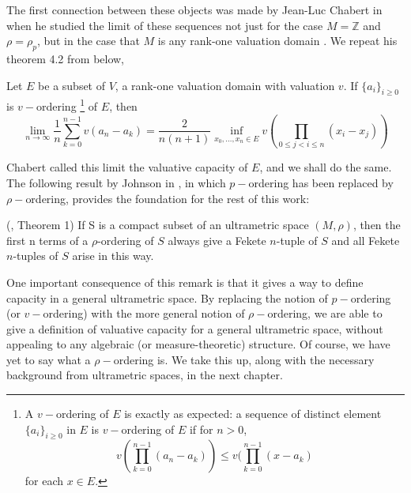 The first connection between these objects was made by Jean-Luc Chabert in \cite{jlc} when he studied the limit of these sequences not just for the case $M=\mathbb{Z}$ and $\rho=\rho_p$, but in the case that $M$ is any rank-one valuation domain \cite{jlc}. We repeat his theorem 4.2 from \cite{jlc} below,

\begin{proposition}
Let $E$ be a subset of $V$, a rank-one valuation domain with valuation $v$. If $\{a_i\}_{i \geq 0}$ is $v-$ordering \footnote{A $v-$ordering of $E$ is exactly as expected: a sequence of distinct element $\{a_i\}_{i \geq 0}$ in $E$ is $v-$ordering of $E$ if for $n >0$,
\[ v(\prod_{k=0}^{n-1} (a_n-a_k) ) \leq v(\prod_{k=0}^{n-1} (x-a_k)  \] for each $x \in E$.} of $E$, then
\[\lim_{n\to\infty} \frac{1}{n} \sum_{k=0}^{n-1} v(a_n-a_k) =\frac{2}{n(n+1)} \inf_{x_0, \ldots, x_n \in E} v (\prod_{0\leq j < i \leq n} (x_i-x_j))\]
\end{proposition}

Chabert called this limit the valuative capacity of $E$, and we shall do the same. The following result by Johnson in \cite{kj}, in which $p-$ordering has been replaced by $\rho-$ordering, provides the foundation for the rest of this work:

\begin{proposition*} (\cite{kj}, Theorem 1)
If S is a compact subset of an ultrametric space $(M, \rho)$, then the first n terms of a $\rho$-ordering of $S$ always give a Fekete $n$-tuple of $S$ and all Fekete $n$-tuples of $S$ arise in this way.
\end{proposition*}

One important consequence of this remark is that it gives a way to define capacity in a general ultrametric space. By replacing the notion of $p-$ordering (or $v-$ordering) with the more general notion of $\rho-$ordering, we are able to give a definition of valuative capacity for a general ultrametric space, without appealing to any algebraic (or measure-theoretic) structure. Of course, we have yet to say what a $\rho-$ordering is.  We take this up, along with the necessary background from ultrametric spaces, in the next chapter.